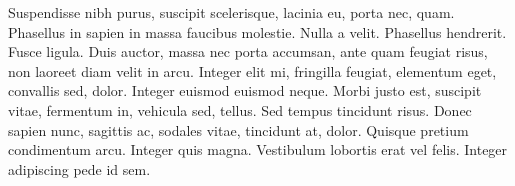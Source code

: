 Suspendisse nibh purus, suscipit scelerisque,
lacinia eu, porta nec, quam. Phasellus in sapien in massa faucibus molestie.
Nulla a velit. Phasellus hendrerit. Fusce ligula. Duis auctor, massa nec porta
accumsan, ante quam feugiat risus, non laoreet diam velit in arcu. Integer elit
mi, fringilla feugiat, elementum eget, convallis sed, dolor. Integer euismod
euismod neque. Morbi justo est, suscipit vitae, fermentum in, vehicula sed,
tellus. Sed tempus tincidunt risus. Donec sapien nunc, sagittis ac, sodales
vitae, tincidunt at, dolor. Quisque pretium condimentum arcu. Integer quis
magna. Vestibulum lobortis erat vel felis. Integer adipiscing pede id sem.